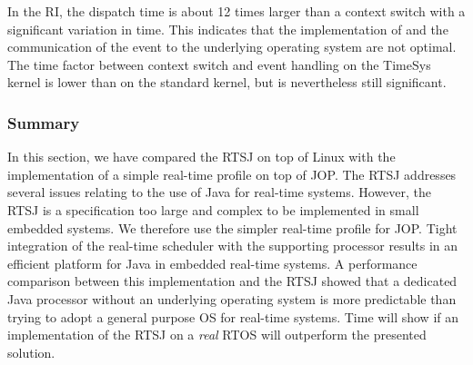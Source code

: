 In the RI, the dispatch time is about 12 times larger than a context
switch with a significant variation in time. This indicates that the
implementation of  and the communication of the event
to the underlying operating system are not optimal. The time factor
between context switch and event handling on the TimeSys kernel is
lower than on the standard kernel, but is nevertheless still
significant.

\subsubsection{Summary}

In this section, we have compared the RTSJ on top of Linux with the
implementation of a simple real-time profile on top of JOP. The RTSJ
addresses several issues relating to the use of Java for real-time
systems. However, the RTSJ is a specification too large and complex
to be implemented in small embedded systems. We therefore use the
simpler real-time profile for JOP. Tight integration of the
real-time scheduler with the supporting processor results in an
efficient platform for Java in embedded real-time systems. A
performance comparison between this implementation and the RTSJ
showed that a dedicated Java processor without an underlying
operating system is more predictable than trying to adopt a general
purpose OS for real-time systems. Time will show if an
implementation of the RTSJ on a \emph{real} RTOS will outperform the
presented solution.




